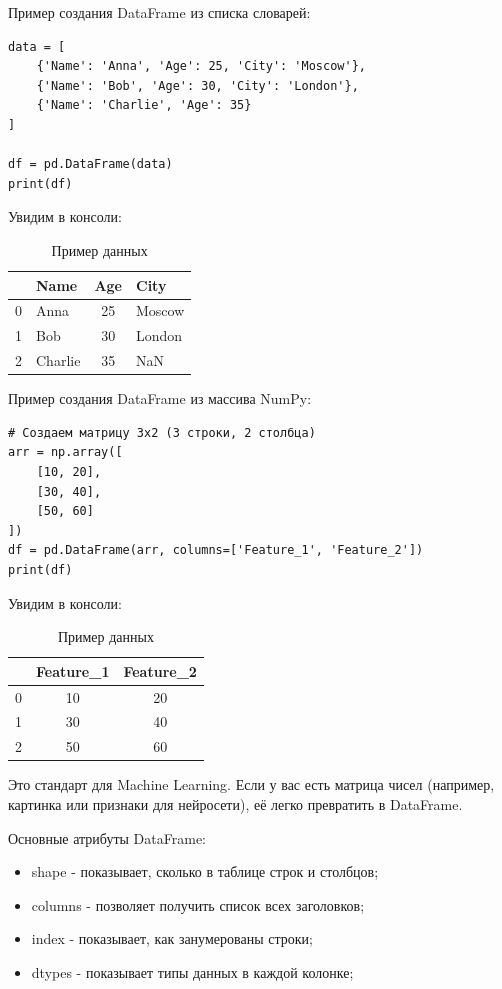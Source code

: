 \documentclass[pract]{SCWorks}
\begin{document}
Пример создания DataFrame из списка словарей:

\begin{verbatim}
data = [
    {'Name': 'Anna', 'Age': 25, 'City': 'Moscow'},
    {'Name': 'Bob', 'Age': 30, 'City': 'London'},
    {'Name': 'Charlie', 'Age': 35}
]

df = pd.DataFrame(data)
print(df)
\end{verbatim}
Увидим в консоли:

\begin{table}[H]
\centering
\caption{Пример данных}
\begin{tabular}{c l c l }
\hline
  & \textbf{Name} & \textbf{Age} & \textbf{City} \\ \hline
0 & Anna   & 25 & Moscow  \\ \hline
1 & Bob    & 30 & London  \\ \hline
2 & Charlie & 35 & NaN   \\ \hline
\end{tabular}
\end{table}

Пример создания DataFrame из массива NumPy:

\begin{verbatim}
# Создаем матрицу 3x2 (3 строки, 2 столбца)
arr = np.array([
    [10, 20],
    [30, 40],
    [50, 60]
])
df = pd.DataFrame(arr, columns=['Feature_1', 'Feature_2'])
print(df)
\end{verbatim}
Увидим в консоли:

\begin{table}[H]
\centering
\caption{Пример данных}
\begin{tabular}{c c c}
\hline
& \textbf{Feature\_1} & \textbf{Feature\_2} \\ \hline
0 & 10 & 20 \\ \hline
1 & 30 & 40 \\ \hline
2 & 50 & 60 \\ \hline
\end{tabular}
\end{table}

Это стандарт для Machine Learning. Если у вас есть матрица чисел (например, картинка или 
признаки для нейросети), её легко превратить в DataFrame.

Основные атрибуты DataFrame:

\begin{itemize}
    \item shape - показывает, сколько в таблице строк и столбцов;
    \item columns - позволяет получить список всех заголовков;
    \item index - показывает, как занумерованы строки;
    \item dtypes - показывает типы данных в каждой колонке;
\end{itemize}
\end{document}
